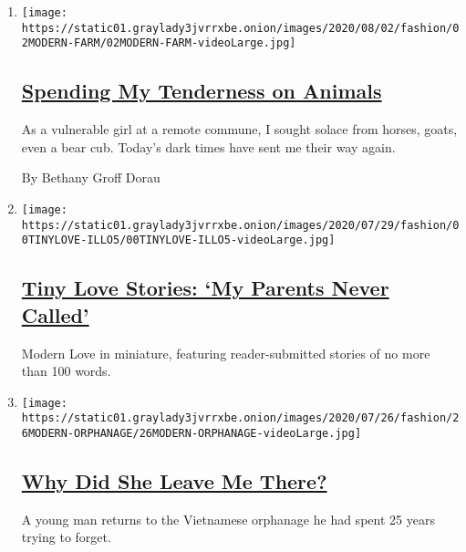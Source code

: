 \begin{enumerate}
\def\labelenumi{\arabic{enumi}.}
\item
  \texttt{[image: https://static01.graylady3jvrrxbe.onion/images/2020/08/02/fashion/02MODERN-FARM/02MODERN-FARM-videoLarge.jpg]}

  \hypertarget{spending-my-tenderness-on-animals}{%
  \subsection{\texorpdfstring{\href{/2020/07/31/style/modern-love-spending-tenderness-on-animals.html}{Spending
  My Tenderness on
  Animals}}{Spending My Tenderness on Animals}}\label{spending-my-tenderness-on-animals}}

  As a vulnerable girl at a remote commune, I sought solace from horses,
  goats, even a bear cub. Today's dark times have sent me their way
  again.

  By Bethany Groff Dorau
\item
  \texttt{[image: https://static01.graylady3jvrrxbe.onion/images/2020/07/29/fashion/00TINYLOVE-ILLO5/00TINYLOVE-ILLO5-videoLarge.jpg]}

  \hypertarget{tiny-love-stories-my-parents-never-called}{%
  \subsection{\texorpdfstring{\href{/2020/07/28/style/tiny-modern-love-stories-coronavirus-my-parents-never-called.html}{Tiny
  Love Stories: `My Parents Never
  Called'}}{Tiny Love Stories: `My Parents Never Called'}}\label{tiny-love-stories-my-parents-never-called}}

  Modern Love in miniature, featuring reader-submitted stories of no
  more than 100 words.
\item
  \texttt{[image: https://static01.graylady3jvrrxbe.onion/images/2020/07/26/fashion/26MODERN-ORPHANAGE/26MODERN-ORPHANAGE-videoLarge.jpg]}

  \hypertarget{why-did-she-leave-me-there-1}{%
  \subsection{\texorpdfstring{\href{/2020/07/24/style/modern-love-adoption-vietnam-why-did-she-leave-me-there.html}{Why
  Did She Leave Me
  There?}}{Why Did She Leave Me There?}}\label{why-did-she-leave-me-there-1}}

  A young man returns to the Vietnamese orphanage he had spent 25 years
  trying to forget.


\end{enumerate}
